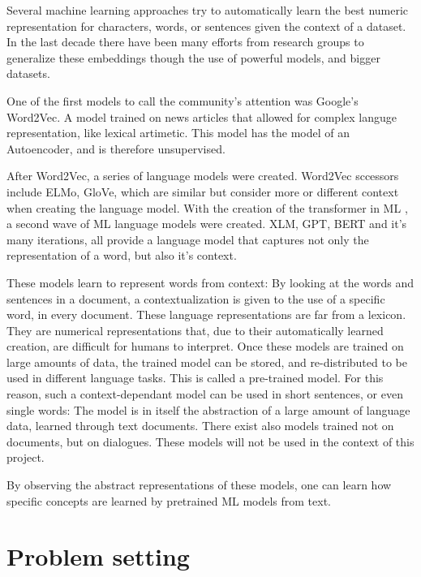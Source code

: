 Several machine learning approaches try to automatically learn the best numeric representation for characters, words, or sentences given the context of a dataset. In the last decade there have been many efforts from research groups to generalize these embeddings though the use of powerful models, and bigger datasets.

One of the first models to call the community's attention was Google's Word2Vec\cite{mikolov2013word2vec}. A model trained on news articles that allowed for complex languge representation, like lexical artimetic. This model has the model of an Autoencoder, and is therefore unsupervised.

After Word2Vec, a series of language models were created. Word2Vec sccessors include ELMo, GloVe, which are similar but consider more or different context when creating the language model. With the creation of the transformer in ML \cite{vaswani2017transformer}, a second wave of ML language models were created. XLM, GPT, BERT and it's many iterations, all provide a language model that captures not only the representation of a word, but also it's context.

These models learn to represent words from context: By looking at the words and sentences in a document, a contextualization is given to the use of a specific word, in every document. These language representations are far from a lexicon. They are numerical representations that, due to their automatically learned creation, are difficult for humans to interpret. Once these models are trained on large amounts of data, the trained model can be stored, and re-distributed to be used in different language tasks. This is called a pre-trained model. For this reason, such a context-dependant model can be used in short sentences, or even single words: The model is in itself the abstraction of a large amount of language data, learned through text documents.
There exist also models trained not on documents, but on dialogues. These models will not be used in the context of this project.

By observing the abstract representations of these models, one can learn how specific concepts are learned by pretrained ML models from text.

\section{Problem setting}\label{sec:Problem setting}

